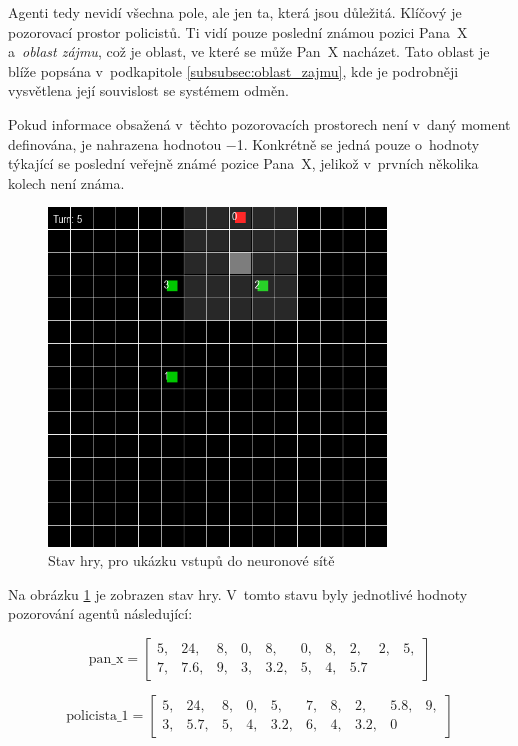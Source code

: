 Agenti tedy nevidí všechna pole, ale jen ta, která jsou důležitá.
Klíčový je pozorovací prostor policistů.
Ti vidí pouze poslední známou pozici Pana~X a~\emph{oblast zájmu}, což je oblast, ve které se může Pan~X nacházet.
Tato oblast je blíže popsána v~podkapitole  \ref{subsubsec:oblast_zajmu}, kde je podrobněji vysvětlena její souvislost se systémem odměn.

Pokud informace obsažená v~těchto pozorovacích prostorech není v~daný moment definována, je nahrazena hodnotou $\minus$1.
Konkrétně se jedná pouze o~hodnoty týkající se poslední veřejně známé pozice Pana~X, jelikož v~prvních několika kolech není známa.

\begin{figure}[H]
	\centering
	\includegraphics[width=0.8\textwidth]{obrazky-figures/game_inputs}
      \caption{Stav hry, pro ukázku vstupů do neuronové sítě}
    \label{fig:game_input}
\end{figure}
Na obrázku \ref{fig:game_input} je zobrazen stav hry.
V~tomto stavu byly jednotlivé hodnoty pozorování agentů následující:

\[
\text{pan\_x} = \begin{bmatrix}
5, & 24, & 8, & 0, & 8, & 0, & 8, & 2, & 2, & 5, \\
7, & 7.6, & 9, & 3, & 3.2, & 5, & 4, & 5.7
\end{bmatrix}
\]

\[
\text{policista\_1} = \begin{bmatrix}
5, & 24, & 8, & 0, & 5, & 7, & 8, & 2, & 5.8, & 9, \\
3, & 5.7, & 5, & 4, & 3.2, & 6, & 4, & 3.2, & 0
\end{bmatrix}
\]

